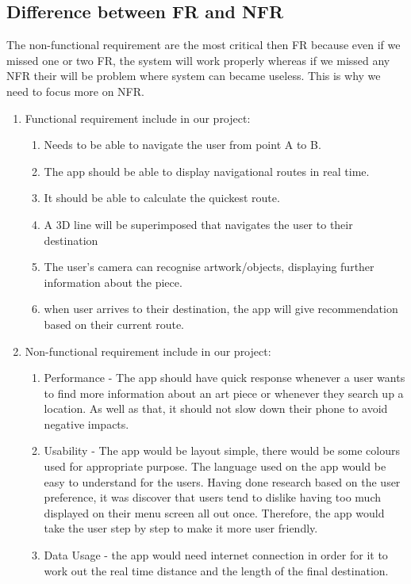 \subsection{Difference between FR and NFR}
The non-functional requirement are the most critical then FR because even if we missed one or two FR, the system will work properly whereas if we missed any NFR their will be problem where system can became useless. This is why we need to focus more on NFR.
\begin{enumerate}
    \item Functional requirement include in our project:
    \begin{enumerate}
        \item Needs to be able to navigate the user from point A to B.
        \item The app should be able to display navigational routes in real time.
        \item It should be able to calculate the quickest route.
        \item A 3D line will be superimposed that navigates the user to their destination
        \item The user’s camera can recognise artwork/objects, displaying further information about the piece.
        \item when user arrives to their destination, the app will give recommendation based on their current route.
    \end{enumerate}
    \item Non-functional requirement include in our project:
    \begin{enumerate}
        \item Performance -  The app should have quick response whenever a user wants to find more information about an art piece or whenever they search up a location. As well as that, it should not slow down their phone to avoid negative impacts.
        \item Usability - The app would be layout simple, there would be some colours used for appropriate purpose. The language used on the app would be easy to understand for the users. Having done research based on the user preference, it was discover that users tend to dislike having too much displayed on their menu screen all out once. Therefore, the app would take the user step by step to make it more user friendly.
        \item Data Usage - the app would need internet connection in order for it to work out the real time distance and the length of the final destination.
    \end{enumerate}
\end{enumerate}

